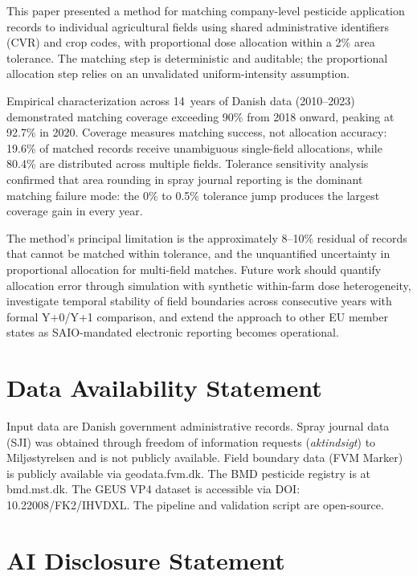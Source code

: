 \documentclass[12pt,a4paper]{article}
\begin{document}
This paper presented a method for matching company-level pesticide application records to individual agricultural fields using shared administrative identifiers (CVR) and crop codes, with proportional dose allocation within a 2\% area tolerance. The matching step is deterministic and auditable; the proportional allocation step relies on an unvalidated uniform-intensity assumption.

Empirical characterization across 14~years of Danish data (2010--2023) demonstrated matching coverage exceeding 90\% from 2018 onward, peaking at 92.7\% in 2020. Coverage measures matching success, not allocation accuracy: 19.6\% of matched records receive unambiguous single-field allocations, while 80.4\% are distributed across multiple fields. Tolerance sensitivity analysis confirmed that area rounding in spray journal reporting is the dominant matching failure mode: the 0\% to 0.5\% tolerance jump produces the largest coverage gain in every year.

The method's principal limitation is the approximately 8--10\% residual of records that cannot be matched within tolerance, and the unquantified uncertainty in proportional allocation for multi-field matches. Future work should quantify allocation error through simulation with synthetic within-farm dose heterogeneity, investigate temporal stability of field boundaries across consecutive years with formal Y+0/Y+1 comparison, and extend the approach to other EU member states as SAIO-mandated electronic reporting becomes operational.

\section*{Data Availability Statement}

Input data are Danish government administrative records. Spray journal data (SJI) was obtained through freedom of information requests (\textit{aktindsigt}) to Milj\o styrelsen and is not publicly available. Field boundary data (FVM Marker) is publicly available via geodata.fvm.dk. The BMD pesticide registry is at bmd.mst.dk. The GEUS VP4 dataset is accessible via DOI: 10.22008/FK2/IHVDXL. The pipeline and validation script are open-source.

\section*{AI Disclosure Statement}
\end{document}
